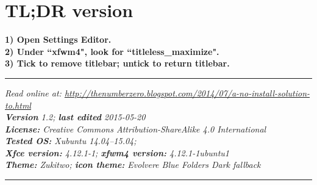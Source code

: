 \documentclass[12pt, a4paper]{article}
\begin{document}
\section*{TL;DR version}

\textbf{1) Open Settings Editor.\\
2) Under ``xfwm4", look for ``titleless\_maximize".\\
3) Tick to remove titlebar; untick to return titlebar.}\\

\vspace{5cm}
\hrule
\noindent \center \emph{Read online at: \url{http://thenumberzero.blogspot.com/2014/07/a-no-install-solution-to.html}\\
\textbf{Version} 1.2; \textbf{last edited} 2015-05-20\\
\textbf{License:} Creative Commons Attribution-ShareAlike 4.0 International\\
\textbf{Tested OS:} Xubuntu 14.04--15.04;\\ \textbf{Xfce version:} 4.12.1-1; \textbf{xfwm4 version:} 4.12.1-1ubuntu1\\ \textbf{Theme:} Zukitwo; \textbf{icon theme:} Evolvere Blue Folders Dark fallback}
\vspace{1em}
\hrule
\end{document}

